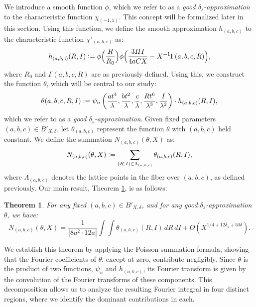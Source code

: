 \documentclass{article}
\newtheorem{theorem}{Theorem}[section]
\begin{document}
We introduce a smooth function $\phi$, which we refer to as a \textit{good $\delta_s$-approximation} to the characteristic function $\chi_{(-1,1)}$. This concept will be formalized later in this section. Using this function, we define the smooth approximation $h_{(a,b,c)}$ to the characteristic function $\chi'_{(a,b,c)}$ as: \begin{equation*} 
h_{(a,b,c)}(R, I) \vcentcolon= \phi\Big(\frac{R}{R_0}\Big) \phi\Big(\frac{3HI}{4aCX} - X^{-1}\Gamma(a,b,c,R)\Big), \end{equation*} where $R_0$ and $\Gamma(a,b,c,R)$ are as previously defined. Using this, we construct the function $\theta$, which will be central to our study:
\begin{equation*} 
\theta(a, b, c, R, I) \vcentcolon= \psi_{n}\left(\frac{at^4}{\lambda}, \frac{bt^2}{\lambda}, \frac{c}{\lambda}, \frac{Rt^6}{\lambda^3}, \frac{I}{\lambda^2}\right) \cdot h_{(a,b,c)}(R,I),
\end{equation*}
which we refer to as a \textit{good $\delta_s$-approximation}. Given fixed parameters $(a, b, c) \in B'_{X, \delta}$, let $\theta_{(a, b, c)}$ represent the function $\theta$ with $(a, b, c)$ held constant. We define the summation $N_{(a, b, c)}(\theta,X)$ as: \begin{equation*} N_{(a, b, c)}(\theta, X) \vcentcolon= \sum_{(R, I) \in \Lambda_{(a, b, c)}} \theta_{(a, b, c)}(R, I), \end{equation*} where $\Lambda_{(a, b, c)}$ denotes the lattice points in the fiber over $(a, b, c)$, as defined previously. Our main result, Theorem \ref{Base-Poisson-Counting}, is as follows:

\begin{theorem}\label{Base-Poisson-Counting}
For any fixed $(a, b, c) \in B'_{X, \delta}$, and for any good $\delta_s$-approximation $\theta$, we have:
\begin{equation*}
N_{(a, b, c)}(\theta, X) = \frac{1}{|8a^2 \cdot 12a|} \int \int \theta_{(a, b, c)}(R, I) \, dR \, dI + O(X^{1/4 + 12\delta_s+50\delta}).
\end{equation*}
\end{theorem}


We establish this theorem by applying the Poisson summation formula, showing that the Fourier coefficients of $\theta$, except at zero, contribute negligibly. Since $\theta$ is the product of two functions, $\psi_{n}$ and $h_{(a,b,c)}$, its Fourier transform is given by the convolution of the Fourier transforms of these components. This decomposition allows us to analyze the resulting Fourier integral in four distinct regions, where we identify the dominant contributions in each.
\end{document}
